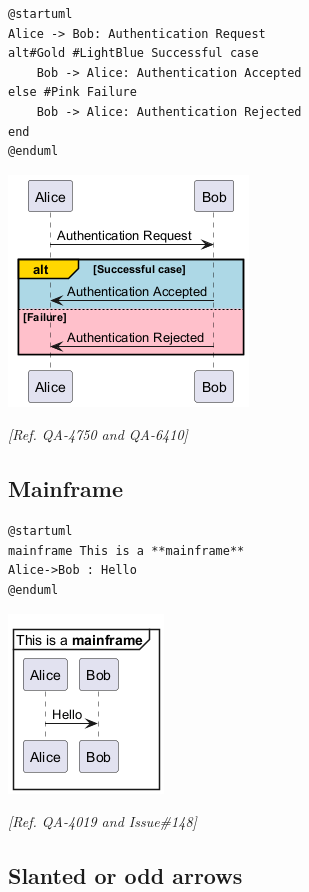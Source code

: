 \begin{verbatim}
@startuml
Alice -> Bob: Authentication Request
alt#Gold #LightBlue Successful case
    Bob -> Alice: Authentication Accepted
else #Pink Failure
    Bob -> Alice: Authentication Rejected
end
@enduml
\end{verbatim}
\begin{center}
\includegraphics[scale=0.60]{imgw/img-2d3195fe252864acdfcf9cf8bc22d02e.png}
\end{center}
\textit{[Ref. QA-4750 and QA-6410]}
%
%
\subsection{Mainframe}


\begin{verbatim}
@startuml
mainframe This is a **mainframe**
Alice->Bob : Hello
@enduml
\end{verbatim}
\begin{center}
\includegraphics[scale=0.60]{imgw/img-74f1ac5f2491c99938f9ffb694d3baea.png}
\end{center}


\textit{[Ref. QA-4019 and Issue\#148]}
%
%
\subsection{Slanted or odd arrows }


